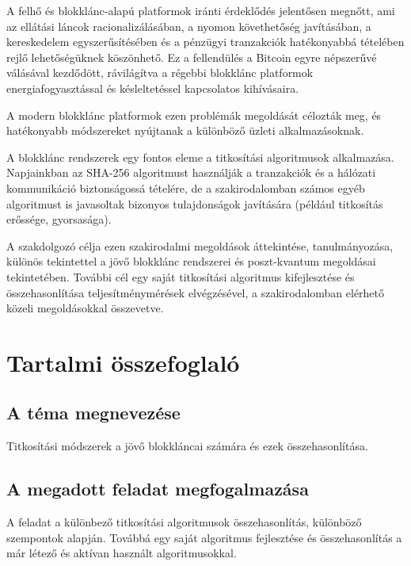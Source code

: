 \documentclass[12pt]{report} %
\begin{document}
A felhő és blokklánc-alapú platformok iránti érdeklődés jelentősen megnőtt, ami az ellátási láncok racionalizálásában, a nyomon követhetőség javításában, a kereskedelem egyszerűsítésében és a pénzügyi tranzakciók hatékonyabbá tételében rejlő lehetőségüknek köszönhető. Ez a fellendülés a Bitcoin egyre népszerűvé válásával kezdődött, rávilágítva a régebbi blokklánc platformok energiafogyasztással és késleltetéssel kapcsolatos kihívásaira.

A modern blokklánc platformok ezen problémák megoldását célozták meg, és hatékonyabb módszereket nyújtanak a különböző üzleti alkalmazásoknak.

A blokklánc rendszerek egy fontos eleme a titkosítási algoritmusok alkalmazása. Napjainkban az SHA-256 algoritmust használják a tranzakciók és a hálózati kommunikáció biztonságossá tételére, de a szakirodalomban számos egyéb algoritmust is javasoltak bizonyos tulajdonságok javítására (például titkosítás erőssége, gyorsasága).

A szakdolgozó célja ezen szakirodalmi megoldások áttekintése, tanulmányozása, különös tekintettel a jövő blokklánc rendszerei és poszt-kvantum megoldásai tekintetében. További cél egy saját titkosítási algoritmus kifejlesztése és összehasonlítása teljesítménymérések elvégzésével, a szakirodalomban elérhető közeli megoldásokkal összevetve.

\chapter*{Tartalmi összefoglaló} %

\section*{A téma megnevezése} %

Titkosítási módszerek a jövő blokkláncai számára és ezek összehasonlítása.

\section*{A megadott feladat megfogalmazása} %

A feladat a különbező titkosítási algoritmusok összehasonlítás, különböző szempontok alapján. Továbbá egy saját algoritmus fejlesztése és összehasonlítás a már létező és aktívan használt algoritmusokkal.
\end{document}
